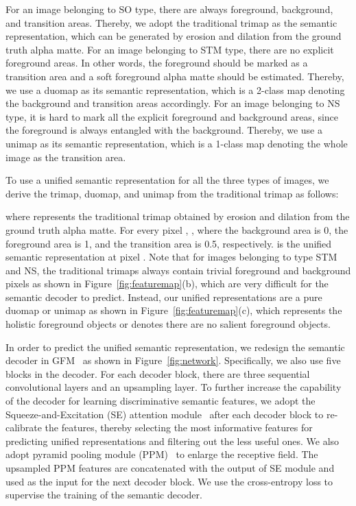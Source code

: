 \documentclass{article}
\begin{document}
For an image belonging to SO type, there are always foreground, background, and transition areas. Thereby, we adopt the traditional trimap as the semantic representation, which can be generated by erosion and dilation from the ground truth alpha matte. For an image belonging to STM type, there are no explicit foreground areas. In other words, the foreground should be marked as a transition area and a soft foreground alpha matte should be estimated. Thereby, we use a duomap as its semantic representation, which is a 2-class map denoting the background and transition areas accordingly. For an image belonging to NS type, it is hard to mark all the explicit foreground and background areas, since the foreground is always entangled with the background. Thereby, we use a unimap as its semantic representation, which is a 1-class map denoting the whole image as the transition area. 

To use a unified semantic representation for all the three types of images, we derive the trimap, duomap, and unimap from the traditional trimap as follows:

where  represents the traditional trimap obtained by erosion and dilation from the ground truth alpha matte. For every pixel , , where the background area is 0, the foreground area is 1, and the transition area is 0.5, respectively.  is the unified semantic representation at pixel . Note that for images belonging to type STM and NS, the traditional trimaps always contain trivial foreground and background pixels as shown in Figure~\ref{fig:featuremap}(b), which are very difficult for the semantic decoder to predict. Instead, our unified representations are a pure duomap or unimap as shown in Figure~\ref{fig:featuremap}(c), which represents the holistic foreground objects or denotes there are no salient foreground objects.

In order to predict the unified semantic representation, we redesign the semantic decoder in GFM~\cite{gfm} as shown in Figure~\ref{fig:network}. Specifically, we also use five blocks in the decoder. For each decoder block, there are three sequential  convolutional layers and an upsampling layer. To further increase the capability of the decoder for learning discriminative semantic features, we adopt the Squeeze-and-Excitation (SE) attention module~\cite{hu2018squeeze} after each decoder block to re-calibrate the features, thereby selecting the most informative features for predicting unified representations and filtering out the less useful ones. We also adopt pyramid pooling module (PPM)~\cite{zhao2017pyramid} to enlarge the receptive field. The upsampled PPM features are concatenated with the output of SE module and used as the input for the next decoder block. We use the cross-entropy loss to supervise the training of the semantic decoder.
\end{document}

